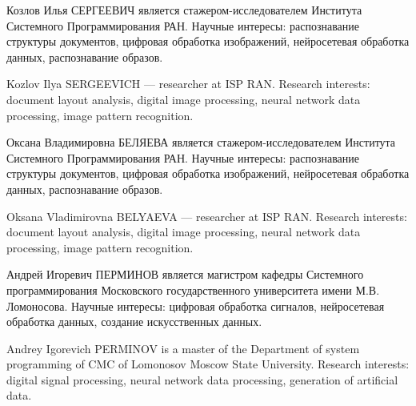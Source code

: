 \documentclass{ProcISPRAS}
\begin{document}
Козлов Илья СЕРГЕЕВИЧ  является стажером-исследователем Института Системного Программирования РАН. Научные интересы: распознавание структуры документов, цифровая обработка изображений, нейросетевая обработка данных, распознавание образов.

Kozlov Ilya SERGEEVICH --- researcher at ISP RAN. Research interests: document layout analysis, digital image processing, neural network data processing, image pattern recognition.

Оксана Владимировна БЕЛЯЕВА является стажером-исследователем Института Системного Программирования РАН. Научные интересы: распознавание структуры документов, цифровая обработка изображений, нейросетевая обработка данных, распознавание образов.

Oksana Vladimirovna BELYAEVA --- researcher at ISP RAN. Research interests: document layout analysis, digital image processing, neural network data processing, image pattern recognition.

Андрей Игоревич ПЕРМИНОВ является магистром кафедры Системного программирования Московского государственного университета имени М.В. Ломоносова. Научные интересы: цифровая обработка сигналов, нейросетевая обработка данных, создание искусственных данных.

Andrey Igorevich PERMINOV is a master of the Department of system programming of CMC of Lomonosov Moscow State University. Research interests: digital signal processing, neural network data processing, generation of artificial data.
\end{document}
